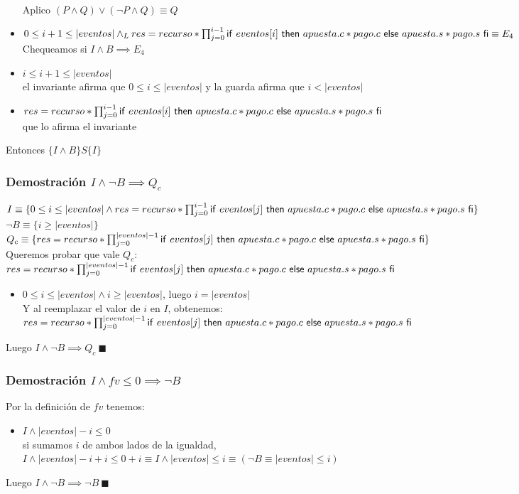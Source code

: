 \documentclass[10pt,a4paper]{article}
\begin{document}
\begin{minipage}[t]{18cm}
\begin{itemize}
	\\ Aplico $(P \land Q) \lor (\neg P \land Q) \equiv Q$
	\item  $0 \leq i + 1 \leq |eventos| \land _L res = recurso * \prod_{j = 0}^{i-1}\mathsf{if}\ eventos[i]\ \mathsf{then}\ apuesta.c*pago.c\ \mathsf{else}\ apuesta.s*pago.s\ \mathsf{fi} \equiv E_4$
	\\ Chequeamos si $I \land B \implies E_4$
	\item $i \leq i + 1 \leq |eventos|$ \\
	el invariante afirma que $0 \leq i \leq |eventos|$ y la guarda afirma que $i < |eventos|$
	\item $res = recurso * \prod_{j = 0}^{i-1}\mathsf{if}\ eventos[i]\ \mathsf{then}\ apuesta.c*pago.c\ \mathsf{else}\ apuesta.s*pago.s\ \mathsf{fi}$ \\
	que lo afirma el invariante
\end{itemize}
Entonces $\{I\land B\}S\{I\}$
\subsubsection*{Demostración $I \land \neg B \implies Q_c$}
$I \equiv \{0 \leq i \leq |eventos| \land res = recurso * \prod_{j = 0}^{i - 1} \mathsf{if}\ eventos[j]\ \mathsf{then}\ apuesta.c *pago.c\ \mathsf{else}\ apuesta.s * pago.s\ \mathsf{fi}\}$ \\
$\neg B \equiv \{i \geq |eventos|\}$ \\
$Q_c \equiv \{res = recurso * \prod_{j = 0}^{|eventos| - 1} \mathsf{if}\ eventos[j]\ \mathsf{then}\ apuesta.c *pago.c\ \mathsf{else}\ apuesta.s * pago.s\ \mathsf{fi}\}$ \\
Queremos probar que vale $Q_c$: \\
$res  = recurso * \prod_{j = 0}^{|eventos| - 1} \mathsf{if}\ eventos[j]\ \mathsf{then}\ apuesta.c *pago.c\ \mathsf{else}\ apuesta.s * pago.s\ \mathsf{fi}$
\begin{itemize}
	\item $0 \leq i \leq |eventos| \land i \geq |eventos|$, luego $i = |eventos| $ \\ Y al reemplazar el valor de $i$ en $I$, obtenemos: \\
	$res = recurso * \prod_{j = 0}^{|eventos| - 1} \mathsf{if}\ eventos[j]\ \mathsf{then}\ apuesta.c *pago.c\ \mathsf{else}\ apuesta.s * pago.s\ \mathsf{fi}$
\end{itemize}
Luego $I \land \neg B \implies Q_c\ \blacksquare$
\subsubsection*{Demostración $I\land fv \leq 0 \implies \neg B$}
Por la definición de $fv$ tenemos:
\begin{itemize}
	\item $I \land |eventos| - i \leq 0$ \\
	si sumamos $i$ de ambos lados de la igualdad, \\$I \land |eventos| - i + i\leq 0 + i \equiv I \land |eventos| \leq i \equiv (\neg B \equiv |eventos| \leq i)$
\end{itemize}
Luego $I \land \neg B \implies \neg B\ \blacksquare$
\end{minipage}
\end{document}

